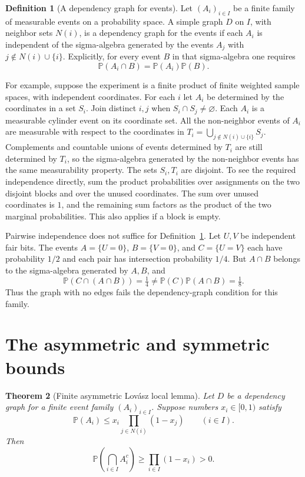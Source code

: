 \documentclass[11pt,oneside,openany]{book}
\theoremstyle{plain}
\newtheorem{theorem}{Theorem}[chapter]
\theoremstyle{definition}
\newtheorem{definition}[theorem]{Definition}
\theoremstyle{remark}
\begin{document}
\begin{definition}[A dependency graph for events]
\label{p205:W27}
Let \((A_i)_{i\in I}\) be a finite family of measurable events on a
probability space. A simple graph \(D\) on \(I\), with neighbor sets
\(N(i)\), is a dependency graph for the events if each \(A_i\) is
independent of the sigma-algebra generated by the events
\(A_j\) with \(j\notin N(i)\cup\{i\}\). Explicitly, for every event
\(B\) in that sigma-algebra one requires
\[
   \mathbb P(A_i\cap B)=\mathbb P(A_i)\mathbb P(B).
\]
\end{definition}

For example, suppose the experiment is a finite product of finite
weighted sample spaces, with independent coordinates. For each
\(i\) let \(A_i\) be determined by the coordinates in a set \(S_i\).
Join distinct \(i,j\) when \(S_i\cap S_j\ne\varnothing\). Each \(A_i\)
is a measurable cylinder event on its coordinate set. All the
non-neighbor events of \(A_i\) are measurable with respect to the
coordinates in \(T_i=\bigcup_{j\notin N(i)\cup\{i\}} S_j\).
Complements and countable unions of events determined by \(T_i\)
are still determined by \(T_i\), so the sigma-algebra generated by
the non-neighbor events has the same measurability property.
The sets \(S_i,T_i\) are disjoint. To see the required independence
directly, sum the product probabilities over assignments on the
two disjoint blocks and over the unused coordinates. The sum over
unused coordinates is \(1\), and the remaining sum factors as the
product of the two marginal probabilities. This also applies if a
block is empty.

Pairwise independence does not suffice for
Definition~\ref{p205:W27}. Let \(U,V\) be independent fair bits.
The events \(A=\{U=0\}\), \(B=\{V=0\}\), and \(C=\{U=V\}\)
each have probability \(1/2\) and each pair has intersection
probability \(1/4\). But \(A\cap B\) belongs to the sigma-algebra
generated by \(A,B\), and
\[
   \mathbb P(C\cap(A\cap B))=\tfrac14
      \ne\mathbb P(C)\mathbb P(A\cap B)=\tfrac18 .
\]
Thus the graph with no edges fails the dependency-graph condition
for this family.

\section{The asymmetric and symmetric bounds}

\begin{theorem}[Finite asymmetric Lov\'asz local lemma]
\label{p205:W28}
Let \(D\) be a dependency graph for a finite event family
\((A_i)_{i\in I}\). Suppose numbers \(x_i\in[0,1)\) satisfy
\[
   \mathbb P(A_i)\le x_i\prod_{j\in N(i)}(1-x_j)
   \qquad(i\in I).
\]
Then
\[
   \mathbb P\!\left(\bigcap_{i\in I}A_i^c\right)
     \ge \prod_{i\in I}(1-x_i)>0 .
\]
\end{theorem}
\end{document}

